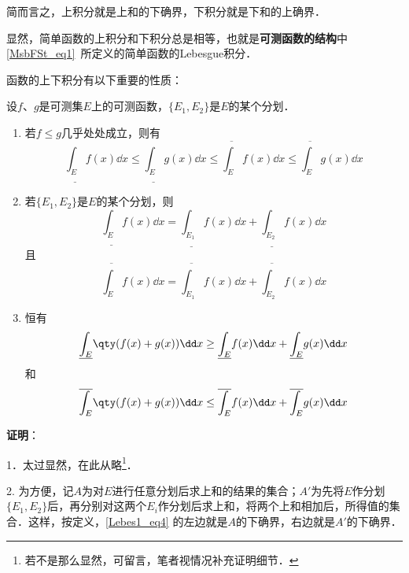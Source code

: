 简而言之，上积分就是上和的下确界，下积分就是下和的上确界．

显然，简单函数的上积分和下积分总是相等，也就是\textbf{可测函数的结构}中\autoref{MsbFSt_eq1}~所定义的简单函数的Lebesgue积分．

函数的上下积分有以下重要的性质：

\begin{theorem}{}\label{Lebes1_the1}

设$f$、$g$是可测集$E$上的可测函数，$\{E_1, E_2\}$是$E$的某个分划．

\begin{enumerate}
  \item 若$f\leq g$几乎处处成立，则有
  \begin{equation}
  \underline{\int_E} f(x) \dd x \leq \underline{\int_E} g(x) \dd x \leq \overline{\int_E} f(x) \dd x \leq \overline{\int_E} g(x) \dd x
  \end{equation}
  \item 若$\{E_1, E_2\}$是$E$的某个分划，则
  \begin{equation}\label{Lebes1_eq1}
  \underline{\int_E} f(x) \dd x=\underline{\int_{E_1}} f(x) \dd x+\underline{\int_{E_2}} f(x) \dd x
  \end{equation}
  且
  \begin{equation}\label{Lebes1_eq4}
  \overline{\int_E} f(x) \dd x=\overline{\int_{E_1}} f(x) \dd x+\overline{\int_{E_2}} f(x) \dd x
  \end{equation}
  \item 恒有
  \begin{equation}\label{Lebes1_eq5}
  \underline{\int_E} \qty(f(x)+g(x)) \dd x \geq \underline{\int_E} f(x) \dd x+\underline{\int_E} g(x) \dd x
  \end{equation}
  和
  \begin{equation}\label{Lebes1_eq6}
  \overline{\int_E} \qty(f(x)+g(x)) \dd x \leq \overline{\int_E} f(x) \dd x+\overline{\int_E} g(x) \dd x
  \end{equation}
\end{enumerate}



\end{theorem}

\textbf{证明}：

1．太过显然，在此从略\footnote{若不是那么显然，可留言，笔者视情况补充证明细节．}．

2. 为方便，记$A$为对$E$进行任意分划后求上和的结果的集合；$A'$为先将$E$作分划$\{E_1, E_2\}$后，再分别对这两个$E_i$作分划后求上和，将两个上和相加后，所得值的集合．这样，按定义，\autoref{Lebes1_eq4} 的左边就是$A$的下确界，右边就是$A'$的下确界．

